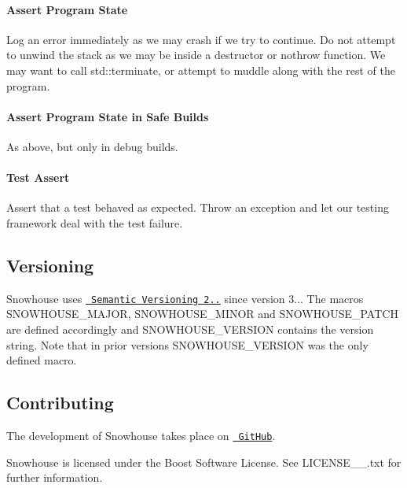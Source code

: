 \paragraph*{Assert Program State}

Log an error immediately as we may crash if we try to continue. Do not attempt to unwind the stack as we may be inside a destructor or {\ttfamily nothrow} function. We may want to call {\ttfamily std\+::terminate}, or attempt to muddle along with the rest of the program.

\paragraph*{Assert Program State in Safe Builds}

As above, but only in debug builds.

\paragraph*{Test Assert}

Assert that a test behaved as expected. Throw an exception and let our testing framework deal with the test failure.

\subsection*{Versioning}

Snowhouse uses \href{http://semver.org/spec/v2.0.0.html}{\texttt{ Semantic Versioning 2..}} since version 3... The macros {\ttfamily S\+N\+O\+W\+H\+O\+U\+S\+E\+\_\+\+M\+A\+J\+OR}, {\ttfamily S\+N\+O\+W\+H\+O\+U\+S\+E\+\_\+\+M\+I\+N\+OR} and {\ttfamily S\+N\+O\+W\+H\+O\+U\+S\+E\+\_\+\+P\+A\+T\+CH} are defined accordingly and {\ttfamily S\+N\+O\+W\+H\+O\+U\+S\+E\+\_\+\+V\+E\+R\+S\+I\+ON} contains the version string. Note that in prior versions {\ttfamily S\+N\+O\+W\+H\+O\+U\+S\+E\+\_\+\+V\+E\+R\+S\+I\+ON} was the only defined macro.

\subsection*{Contributing}

The development of Snowhouse takes place on \href{//github.com/banditcpp/snowhouse}{\texttt{ Git\+Hub}}.

Snowhouse is licensed under the Boost Software License. See L\+I\+C\+E\+N\+S\+E\+\_\+\_.\+txt for further information.

